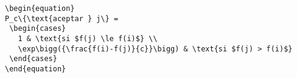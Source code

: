 \documentclass[letterpaper,12pt]{article}
\begin{document}
\pagestyle{empty}
\thispagestyle{empty}

\noindent

\begin{verbatim}
\begin{equation}
P_c\{\text{aceptar } j\} =
 \begin{cases}
   1 & \text{si $f(j) \le f(i)$} \\
   \exp\bigg({\frac{f(i)-f(j)}{c}}\bigg) & \text{si $f(j) > f(i)$}
 \end{cases}
\end{equation}
\end{verbatim}
\end{document}

